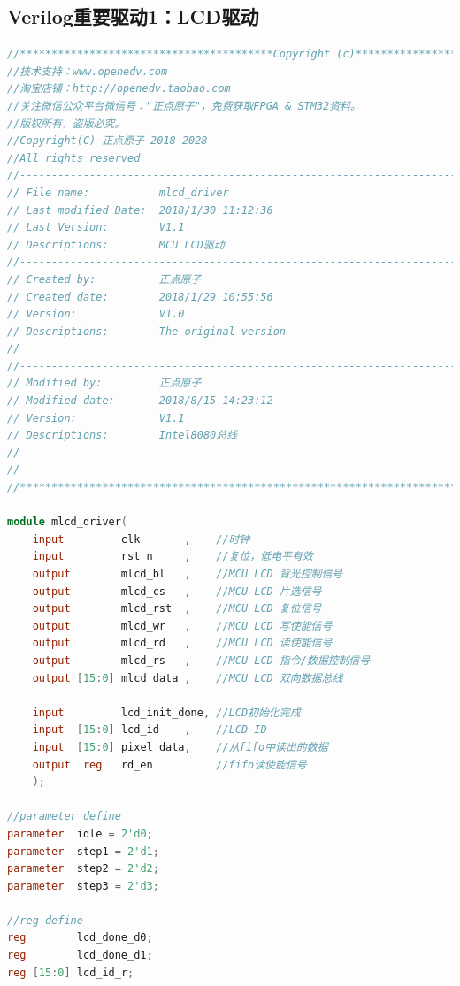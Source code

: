\documentclass[12pt,hyperref,a4paper,UTF8]{ctexart}
\begin{document}
\subsection{Verilog重要驱动1：LCD驱动}

\begin{lstlisting}[language=Verilog]
//****************************************Copyright (c)***********************************//
//技术支持：www.openedv.com
//淘宝店铺：http://openedv.taobao.com 
//关注微信公众平台微信号："正点原子"，免费获取FPGA & STM32资料。
//版权所有，盗版必究。
//Copyright(C) 正点原子 2018-2028
//All rights reserved                                  
//----------------------------------------------------------------------------------------
// File name:           mlcd_driver
// Last modified Date:  2018/1/30 11:12:36
// Last Version:        V1.1
// Descriptions:        MCU LCD驱动
//----------------------------------------------------------------------------------------
// Created by:          正点原子
// Created date:        2018/1/29 10:55:56
// Version:             V1.0
// Descriptions:        The original version
//
//----------------------------------------------------------------------------------------
// Modified by:         正点原子
// Modified date:       2018/8/15 14:23:12
// Version:             V1.1
// Descriptions:        Intel8080总线
//
//----------------------------------------------------------------------------------------
//****************************************************************************************//

module mlcd_driver(
    input         clk       ,    //时钟
    input         rst_n     ,    //复位，低电平有效
    output        mlcd_bl   ,    //MCU LCD 背光控制信号 
    output        mlcd_cs   ,    //MCU LCD 片选信号 
    output        mlcd_rst  ,    //MCU LCD 复位信号
    output        mlcd_wr   ,    //MCU LCD 写使能信号
    output        mlcd_rd   ,    //MCU LCD 读使能信号
    output        mlcd_rs   ,    //MCU LCD 指令/数据控制信号
    output [15:0] mlcd_data ,    //MCU LCD 双向数据总线
    
    input         lcd_init_done, //LCD初始化完成
    input  [15:0] lcd_id    ,    //LCD ID
    input  [15:0] pixel_data,    //从fifo中读出的数据    
    output  reg   rd_en          //fifo读使能信号
    );
    
//parameter define     
parameter  idle = 2'd0;
parameter  step1 = 2'd1;
parameter  step2 = 2'd2;
parameter  step3 = 2'd3;

//reg define
reg        lcd_done_d0;
reg        lcd_done_d1;
reg [15:0] lcd_id_r;


\end{lstlisting}
\end{document}
